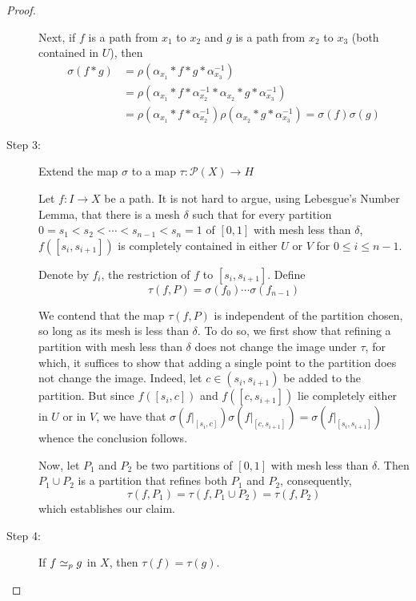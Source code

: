\begin{proof}
\begin{description}
Next, if $f$ is a path from $x_1$ to $x_2$ and $g$ is a path from $x_2$ to $x_3$ (both contained in $U$), then 
\begin{align*}
    \sigma(f * g) &= \rho(\alpha_{x_1} * f * g * \alpha_{x_3}^{-1})\\
    &= \rho(\alpha_{x_1} * f * \alpha_{x_2}^{-1} * \alpha_{x_2} * g * \alpha_{x_3}^{-1})\\ 
    &= \rho(\alpha_{x_1} * f * \alpha_{x_2}^{-1})\rho(\alpha_{x_2} * g * \alpha_{x_3}^{-1}) = \sigma(f)\sigma(g)
\end{align*}

\item[Step 3:] Extend the map $\sigma$ to a map $\tau:\mathscr P(X)\to H$

Let $f: I\to X$ be a path. It is not hard to argue, using Lebesgue's Number Lemma, that there is a mesh $\delta$ such that for every partition $0 = s_1 < s_2 < \cdots < s_{n - 1} < s_n = 1$ of $[0,1]$ with mesh less than $\delta$, $f([s_{i}, s_{i + 1}])$ is completely contained in either $U$ or $V$ for $0\le i\le n - 1$.

Denote by $f_i$, the restriction of $f$ to $[s_i, s_{i + 1}]$. Define 
\begin{equation*}
    \tau(f, P) = \sigma(f_0)\cdots\sigma(f_{n - 1})
\end{equation*}

We contend that the map $\tau(f,P)$ is independent of the partition chosen, so long as its mesh is less than $\delta$. To do so, we first show that refining a partition with mesh less than $\delta$ does not change the image under $\tau$, for which, it suffices to show that adding a single point to the partition does not change the image. Indeed, let $c\in (s_i, s_{i + 1})$ be added to the partition. But since $f([s_i, c])$ and $f([c,s_{i + 1}])$ lie completely either in $U$ or in $V$, we have that $\sigma(f|_{[s_i, c]})\sigma(f|_{[c,s_{i + 1}]}) = \sigma(f|_{[s_i, s_{i + 1}]})$ whence the conclusion follows.

Now, let $P_1$ and $P_2$ be two partitions of $[0,1]$ with mesh less than $\delta$. Then $P_1\cup P_2$ is a partition that refines both $P_1$ and $P_2$, consequently, 
\begin{equation*}
    \tau(f, P_1) = \tau(f, P_1\cup P_2) = \tau(f, P_2)
\end{equation*}
which establishes our claim.

\item[Step 4:] If $f\simeq_p g$ in $X$, then $\tau(f) = \tau(g)$.


\end{description}
\end{proof}
